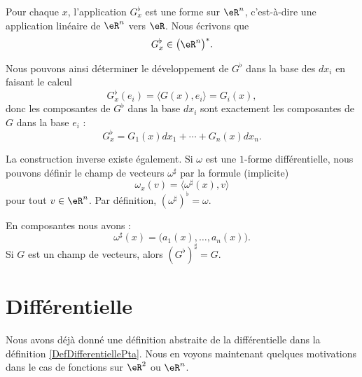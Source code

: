 Pour chaque \( x\), l'application \( G_x^{\flat}\) est une forme sur \( \eR^n\), c'est-à-dire une application linéaire de \( \eR^n\) vers \( \eR\). Nous écrivons que
\begin{equation}
	G_x^{\flat}\in\big( \eR^n \big)^*.
\end{equation}

Nous pouvons ainsi déterminer le développement de \( G^{\flat}\) dans la base des \( dx_i\) en faisant le calcul
\begin{equation}
	G_x^{\flat}(e_i)=\langle G(x), e_i\rangle =G_i(x),
\end{equation}
donc les composantes de \( G^{\flat}\) dans la base \( dx_i\) sont exactement les composantes de \( G\) dans la base \( e_i\) :
\begin{equation}
	G^{\flat}_x=G_1(x)dx_1+\cdots+G_n(x)dx_n.
\end{equation}

La construction inverse existe également. Si \( \omega\) est une \( 1\)-forme différentielle, nous pouvons définir le champ de vecteurs \( \omega^{\sharp}\) par la formule (implicite)
\begin{equation}
	\omega_x(v)=\langle \omega^{\sharp}(x), v\rangle
\end{equation}
pour tout \( v\in\eR^n\). Par définition, \( (\omega^{\sharp})^{\flat}=\omega\).

\begin{lemma}
	En composantes nous avons :
	\begin{equation}
		\omega^{\sharp}(x)=\big( a_1(x),\ldots,a_n(x) \big).
	\end{equation}
	Si \( G\) est un champ de vecteurs, alors \( (G^{\flat})^{\sharp}=G\).
\end{lemma}

\section{Différentielle}

Nous avons déjà donné une définition abstraite de la différentielle dans la définition \ref{DefDifferentiellePta}. Nous en voyons maintenant quelques motivations dans le cas de fonctions sur \( \eR^2\) ou \( \eR^n\).

